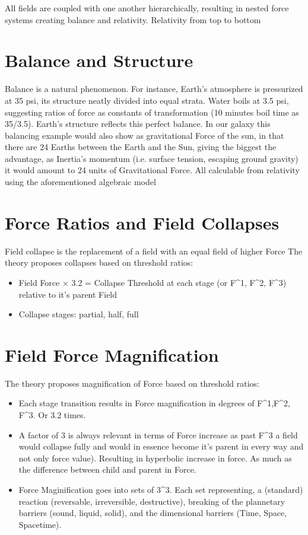 \documentclass[12pt]{thesis}
\begin{document}
All fields are coupled with one another hierarchically, resulting in nested force systems creating balance and relativity. Relativity from top to bottom

\section{Balance and Structure}
Balance is a natural phenomenon. For instance, Earth’s atmosphere is pressurized at 35 psi, its structure neatly divided into equal strata. Water boils at 3.5 psi, suggesting ratios of force as constants of transformation (10 minutes boil time as 35/3.5). Earth’s structure reflects this perfect balance. In our galaxy this balancing example would also show as gravitational Force of the sun, in that there are 24 Earths between the Earth and the Sun, giving the biggest the advantage, as Inertia's momentum (i.e. surface tension, escaping ground gravity) it would amount to 24 units of Gravitational Force. All calculable from relativity using the aforementioned algebraic model

\section{Force Ratios and Field Collapses}
Field collapse is the replacement of a field with an equal field of higher Force
The theory proposes collapses based on threshold ratios:
\begin{itemize}
    \item Field Force $\times$ 3.2 = Collapse Threshold at each stage (or F^1, F^2, F^3) relative to it's parent Field
    \item Collapse stages: partial, half, full
\end{itemize}

\section{Field Force Magnification}
The theory proposes magnification of Force based on threshold ratios:
\begin{itemize}
    \item Each stage transition results in Force magnification in degrees of F^1,F^2, F^3. Or 3.2 times.
    \item A factor of 3 is always relevant in terms of Force increase as past F^3 a field would collapse fully and would in essence become it's parent in every way and not only force value). Resulting in hyperbolic increase in force. As much as the difference between child and parent in Force. 
    \item Force Maginification goes into sets of 3^3. Each set representing, a (standard) reaction (reversable, irreversible, destructive), breaking of the plannetary barriers (sound, liquid, solid), and the dimensional barriers (Time, Space, Spacetime).
\end{itemize}
\end{document}

